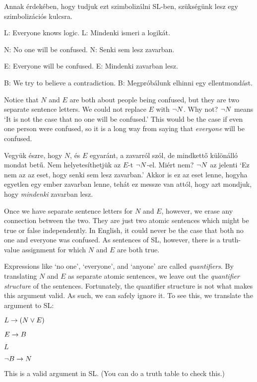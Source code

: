 Annak érdekében, hogy tudjuk ezt szimbolizálni SL-ben, szükségünk lesz egy szimbolizációs kulcsra.
\begin{ekey}
\item[L:] Everyone knows logic.
L: Mindenki ismeri a logikát.
\item[N:] No one will be confused.
N: Senki sem lesz zavarban.
\item[E:] Everyone will be confused.
E: Mindenki zavarban lesz.
\item[B:] We try to believe a contradiction.
B: Megpróbálunk elhinni egy ellentmondást.
\end{ekey}
Notice that $N$ and $E$ are both about people being confused, but they are two separate sentence letters. We could not replace $E$ with $\neg N$. Why not? $\neg N$ means `It is not the case that no one will be confused.' This would be the case if even one person were confused, so it is a long way from saying that \emph{everyone} will be confused.

Vegyük észre, hogy $N$, és $E$ egyaránt, a zavarról szól, de mindkettő különálló mondat betű. Nem helyetesíthetjük az $E$-t $\neg N$-el.  Miért nem?  $\neg N$ az jelenti  ‘Ez nem az az eset, hogy senki sem lesz zavarban.’ Akkor is ez az eset lenne, hogyha egyetlen egy ember zavarban lenne, tehát ez messze van attól, hogy azt mondjuk, hogy \emph{mindenki} zavarban lesz.



Once we have separate sentence letters for $N$ and $E$, however, we erase any connection between the two. They are just two atomic sentences which might be true or false independently. In English, it could never be the case that both no one and everyone was confused. As sentences of SL, however, there is a truth-value assignment for which $N$ and $E$ are both true.

Expressions like `no one', `everyone', and `anyone' are called \emph{quantifiers}. By translating $N$ and $E$ as separate atomic sentences, we leave out the \emph{quantifier structure} of the sentences. Fortunately, the quantifier structure is not what makes this argument valid. As such, we can safely ignore it. To see this, we translate the argument to SL:
\begin{earg}
\item[]$L \rightarrow (N \vee E)$
\item[]$E \rightarrow B$
\item[]$L$
\item[\therefore]$\neg B \rightarrow N$
\end{earg}
This is a valid argument in SL. (You can do a truth table to check this.) 

